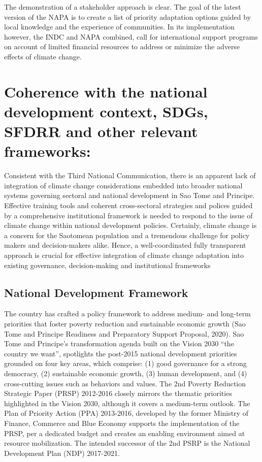 \documentclass[
]{book}
\begin{document}
The demonstration of a stakeholder approach is clear. The goal of the latest version of the NAPA is to create a list of priority adaptation options guided by local knowledge and the experience of communities. In its implementation however, the INDC and NAPA combined, call for international support programs on account of limited financial resources to address or minimize the adverse effects of climate change.

\hypertarget{coherence-with-the-national-development-context-sdgs-sfdrr-and-other-relevant-frameworks}{%
\section{Coherence with the national development context, SDGs, SFDRR and other relevant frameworks:}\label{coherence-with-the-national-development-context-sdgs-sfdrr-and-other-relevant-frameworks}}

Consistent with the Third National Communication, there is an apparent lack of integration of climate change considerations embedded into broader national systems governing sectoral and national development in Sao Tome and Principe. Effective training tools and coherent cross-sectoral strategies and polices guided by a comprehensive institutional framework is needed to respond to the issue of climate change within national development policies. Certainly, climate change is a concern for the Saotomean population and a tremendous challenge for policy makers and decision-makers alike. Hence, a well-coordinated fully transparent approach is crucial for effective integration of climate change adaptation into existing governance, decision-making and institutional frameworks

\hypertarget{national-development-framework}{%
\subsection{National Development Framework}\label{national-development-framework}}

The country has crafted a policy framework to address medium- and long-term priorities that foster poverty reduction and sustainable economic growth (Sao Tome and Principe Readiness and Preparatory Support Proposal, 2020). Sao Tome and Principe's transformation agenda built on the Vision 2030 ``the country we want'', spotlights the post-2015 national development priorities grounded on four key areas, which comprise: (1) good governance for a strong democracy, (2) sustainable economic growth, (3) human development, and (4) cross-cutting issues such as behaviors and values. The 2nd Poverty Reduction Strategic Paper (PRSP) 2012-2016 closely mirrors the thematic priorities highlighted in the Vision 2030, although it covers a medium-term outlook. The Plan of Priority Action (PPA) 2013-2016, developed by the former Ministry of Finance, Commerce and Blue Economy supports the implementation of the PRSP, per a dedicated budget and creates an enabling environment aimed at resource mobilization. The intended successor of the 2nd PSRP is the National Development Plan (NDP) 2017-2021.
\end{document}
